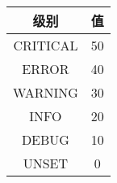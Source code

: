 \begin{table}
    \centering
    \caption{}
    \label{日志级别}
    \begin{tabular}{cc}
        \hline
        级别       & 值  \\
        \hline
        CRITICAL & 50 \\
        ERROR    & 40 \\
        WARNING  & 30 \\
        INFO     & 20 \\
        DEBUG    & 10 \\
        UNSET    & 0  \\
        \hline
    \end{tabular}
\end{table}